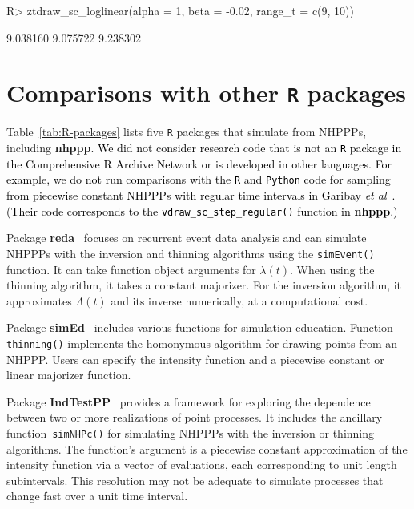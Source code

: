 \documentclass[10pt,letterpaper]{article}
\newcommand{\pkg}[1]{{\bf #1}}
\newcommand{\proglang}[1]{\texttt{#1}}
\newcommand{\fct}[1]{\texttt{#1()}}
\newcommand{\red}[1]{\textcolor{black}{#1}}
\begin{document}
\begin{Schunk}
\begin{Sinput}
R> ztdraw_sc_loglinear(alpha = 1, beta = -0.02, range_t = c(9, 10))
\end{Sinput}
\begin{Soutput}
[1] 9.038160 9.075722 9.238302
\end{Soutput}
\end{Schunk}


\section[Comparisons with other R packages]{Comparisons with other \proglang{R} packages}\label{sec:other-R-packages}

Table~\ref{tab:R-packages} lists five \proglang{R} packages that simulate from NHPPPs, including \pkg{nhppp}. \red{We did not consider research code that is not an \proglang{R} package in the Comprehensive R Archive Network or is developed in other languages. For example, we do not run comparisons with the \proglang{R} and \proglang{Python} code for sampling from piecewise constant NHPPPs with regular time intervals in Garibay \emph{et al}~\cite{garibay2024nps}. (Their code corresponds to the \fct{vdraw\_sc\_step\_regular} function in \pkg{nhppp}.)}

Package \pkg{reda}~\cite{reda-package} focuses on recurrent event data analysis and can simulate NHPPPs with the inversion and thinning algorithms using the \fct{simEvent} function. It can take function object arguments for $\lambda(t)$. When using the thinning algorithm, it takes a constant majorizer. For the inversion algorithm, it approximates $\Lambda(t)$ and its inverse numerically, at a computational cost.

Package \pkg{simEd}~\cite{simEd-package} includes various functions for simulation education. Function \fct{thinning} implements the homonymous algorithm for drawing points from an NHPPP. Users can specify the intensity function and a piecewise constant or linear majorizer function.

Package \pkg{IndTestPP}~\cite{IndTestPP-package} provides a framework for exploring the dependence between two or more realizations of point processes. It includes the ancillary function~\fct{simNHPc} for simulating NHPPPs with the inversion or thinning algorithms. The function's argument is a piecewise constant approximation of the intensity function via a vector of evaluations, each corresponding to unit length subintervals. This resolution may not be adequate to simulate processes that change fast over a unit time interval.
\end{document}
